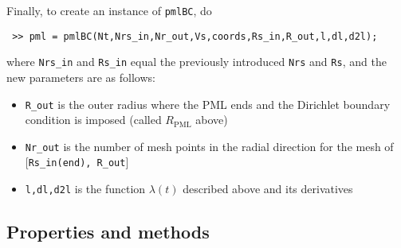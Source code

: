 Finally, to create an instance of {\tt pmlBC}, do
\begin{verbatim}
 >> pml = pmlBC(Nt,Nrs_in,Nr_out,Vs,coords,Rs_in,R_out,l,dl,d2l);
\end{verbatim}
where {\tt Nrs\_in} and {\tt Rs\_in} equal the previously introduced
{\tt Nrs} and {\tt Rs}, and the new parameters are as follows:
\begin{itemize}
 \item {\tt R\_out} is the outer radius where the PML ends and the
       Dirichlet boundary condition is imposed (called $R_{\text{PML}}$
       above)
 \item {\tt Nr\_out} is the number of mesh points in the radial direction
       for the mesh of [{\tt Rs\_in(end), R\_out}]
 \item {\tt l,dl,d2l} is the function $\lambda(t)$ described above and
       its derivatives
\end{itemize}

\subsection{Properties and methods}
\label{sec-pmlBC-properties}

